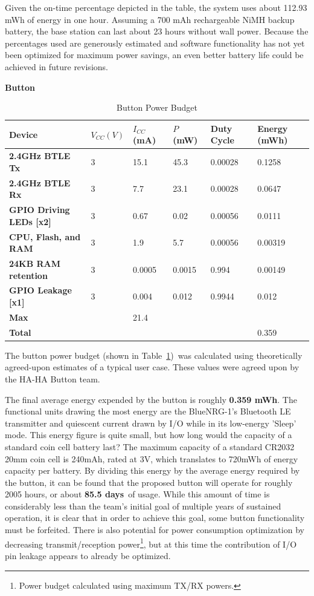 \documentclass[journal,compsoc]{IEEEtran}
\begin{document}
Given the on-time percentage depicted in the table, the system uses about 112.93 mWh of energy in one hour. Assuming a 700 mAh rechargeable NiMH backup battery, the base station can last about 23 hours without wall power. Because the percentages used are generously estimated and software functionality has not yet been optimized for maximum power savings, an even better battery life could be achieved in future revisions.

\textbf{Button}

\begin{table}[t]
  \centering
  \begin{tabular}{>{\bfseries}l|l l l l l}
    Device & $V_{CC} (V)$ & $I_{CC}$ (mA) & $P$ (mW) & Duty Cycle & Energy (mWh) \\
    \hline
    2.4GHz BTLE Tx & 3 & 15.1 & 45.3 & 0.00028 & 0.1258 \\
    2.4GHz BTLE Rx & 3 & 7.7 & 23.1 & 0.00028 & 0.0647 \\
    GPIO Driving LEDs [x2] & 3 & 0.67 & 0.02 & 0.00056 & 0.0111\\
    CPU, Flash, and RAM & 3 & 1.9 & 5.7 & 0.00056 & 0.00319 \\
    24KB RAM retention & 3 & 0.0005 & 0.0015 & 0.994 & 0.00149 \\
    GPIO Leakage [x1] & 3 & 0.004 & 0.012 & 0.9944 & 0.012 \\
    \hline
    Max & & 21.4 & & & \\
    Total & & & & & 0.359
  \end{tabular}
  \caption{Button Power Budget}\label{buttpwr}
\end{table}

The button power budget (shown in Table~\ref{buttpwr})~was calculated using theoretically agreed-upon estimates of a typical user case. These values were agreed upon by the HA-HA Button team.

The final average energy expended by the button is roughly \textbf{0.359 mWh}. The functional units drawing the most energy are the BlueNRG-1's Bluetooth LE transmitter and quiescent current drawn by I/O while in its low-energy 'Sleep' mode. This energy figure is quite small, but how long would the capacity of a standard coin cell battery last? The maximum capacity of a standard CR2032 20mm coin cell is 240mAh, rated at 3V, which translates to 720mWh of energy capacity per battery. By dividing this energy by the average energy required by the button, it can be found that the proposed button will operate for roughly 2005 hours, or about \textbf{85.5 days}~of usage. While this amount of time is considerably less than the team's initial goal of multiple years of sustained operation, it is clear that in order to achieve this goal, some button functionality must be forfeited. There is also potential for power consumption optimization by decreasing transmit/reception power\footnote{Power budget calculated using maximum TX/RX powers.}, but at this time the contribution of I/O pin leakage appears to already be optimized.
\end{document}
